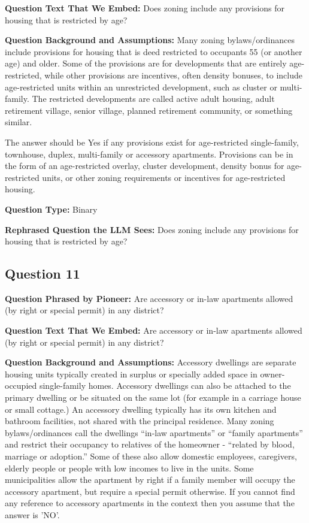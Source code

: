 \noindent\textbf{Question Text That We Embed:} Does zoning include any provisions for housing that is restricted by age?

\noindent\textbf{Question Background and Assumptions:} Many zoning bylaws/ordinances include provisions for housing that is deed restricted to occupants 55 (or another age) and older. Some of the provisions are for developments that are entirely age-restricted, while other provisions are incentives, often density bonuses, to include age-restricted units within an unrestricted development, such as cluster or multi-family. The restricted developments are called active adult housing, adult retirement village, senior village, planned retirement community, or something similar.

The answer should be Yes if any provisions exist for age-restricted single-family, townhouse, duplex, multi-family or accessory apartments. Provisions can be in the form of an age-restricted overlay, cluster development, density bonus for age-restricted units, or other zoning requirements or incentives for age-restricted housing.

\noindent\textbf{Question Type:} Binary

\noindent\textbf{Rephrased Question the LLM Sees:} Does zoning include any provisions for housing that is restricted by age?

\vspace{1cm}
\subsection*{Question 11}
\noindent\textbf{Question Phrased by Pioneer:} Are accessory or in-law apartments allowed (by right or special permit) in any district?

\noindent\textbf{Question Text That We Embed:} Are accessory or in-law apartments allowed (by right or special permit) in any district?

\noindent\textbf{Question Background and Assumptions:} Accessory dwellings are separate housing units typically created in surplus or specially added space in owner-occupied single-family homes. Accessory dwellings can also be attached to the primary dwelling or be situated on the same lot (for example in a carriage house or small cottage.) An accessory dwelling typically has its own kitchen and bathroom facilities, not shared with the principal residence. Many zoning bylaws/ordinances call the dwellings “in-law apartments” or “family apartments” and restrict their occupancy to relatives of the homeowner - “related by blood, marriage or adoption.” Some of these also allow domestic employees, caregivers, elderly people or people with low incomes to live in the units. Some municipalities allow the apartment by right if a family member will occupy the accessory apartment, but require a special permit otherwise. If you cannot find any reference to accessory apartments in the context then you assume that the answer is 'NO'.

